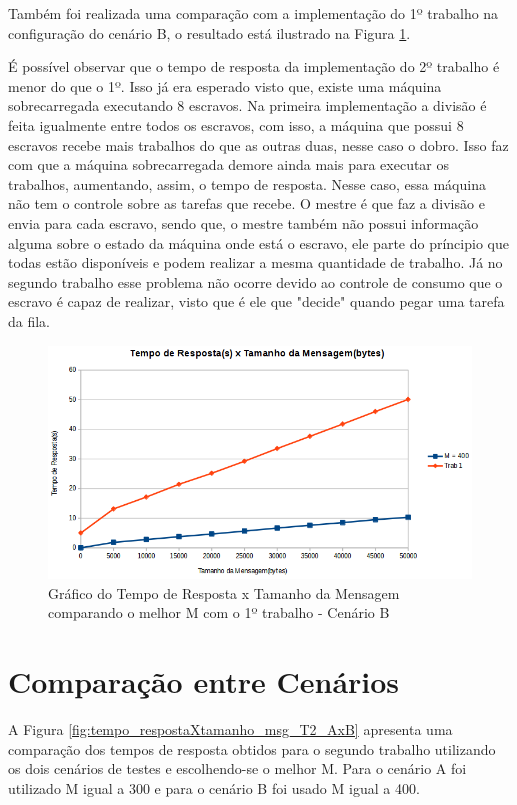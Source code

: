 \documentclass[
	12pt,				%
    oneside,			%
	a4paper,			%
	english,			%
	brazil,				%
	]{abntex2}
\begin{document}
Também foi realizada uma comparação com a implementação do 1º trabalho na configuração do cenário B, o resultado está ilustrado na Figura \ref{fig:tempo_respostaXtamanho_msg_B_T1}.

É possível observar que o tempo de resposta da implementação do 2º trabalho é menor do que o 1º. Isso já era esperado visto que, existe uma máquina sobrecarregada executando 8 escravos. Na primeira implementação a divisão é feita igualmente entre todos os escravos, com isso, a máquina que possui 8 escravos recebe mais trabalhos do que as outras duas, nesse caso o dobro. Isso faz com que a máquina sobrecarregada demore ainda mais para executar os trabalhos, aumentando, assim, o tempo de resposta. Nesse caso, essa máquina não tem o controle sobre as tarefas que recebe. O mestre é que faz a divisão e envia para cada escravo, sendo que, o mestre também não possui informação alguma sobre o estado da máquina onde está o escravo, ele parte do príncipio que todas estão disponíveis e podem realizar a mesma quantidade de trabalho. Já no segundo trabalho esse problema não ocorre devido ao controle de consumo que o escravo é capaz de realizar, visto que é ele que "decide" quando pegar uma tarefa da fila.

\begin{figure}[!htb]
\centering
\includegraphics[scale=0.7]{figuras/B_T1.png}
\caption{Gráfico do Tempo de Resposta x Tamanho da Mensagem comparando o melhor M com o 1º trabalho - Cenário B}
\label{fig:tempo_respostaXtamanho_msg_B_T1}
\end{figure}


\section{Comparação entre Cenários}

A Figura \ref{fig:tempo_respostaXtamanho_msg_T2_AxB} apresenta uma comparação dos tempos de resposta obtidos para o segundo trabalho utilizando os dois cenários de testes e escolhendo-se o melhor M. Para o cenário A foi utilizado M igual a 300 e para o cenário B foi usado M igual a 400.
\end{document}
